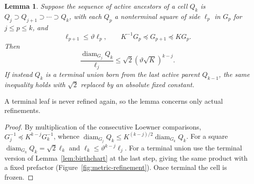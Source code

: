 \documentclass[11pt]{article}
\newtheorem{lemma}[lemma]{Lemma}
\theoremstyle{definition}
\theoremstyle{remark}
\numberwithin{equation}{section}
\begin{document}
\begin{lemma}
\label{lem:ancestorindexed}
Suppose the sequence of active ancestors of a cell $Q_k$ is
$Q_j\supset Q_{j+1}\supset\cdots\supset Q_k$, with each
$Q_p$ a nonterminal square of side $\ell_p$ in $G_p$ for
$j\le p\le k$, and
\[
 \ell_{p+1}\le\vartheta\ell_p,\qquad
 K^{-1}G_p\preceq G_{p+1}\preceq KG_p.
\]
Then
\begin{equation}\label{eq:appancestor}
 \frac{\operatorname{diam}_{G_j}Q_k}{\ell_j}
 \le\sqrt2(\vartheta\sqrt K)^{k-j}.
\end{equation}
If instead $Q_k$ is a terminal union born from the last active
parent $Q_{k-1}$, the same inequality holds with $\sqrt2$
replaced by an absolute fixed constant.
\end{lemma}

A terminal leaf is never refined again, so the lemma concerns only
actual refinements.
\begin{proof}
By multiplication of the consecutive Loewner comparisons,
$G_j^{-1}\preceq K^{k-j}G_k^{-1}$, whence
$\operatorname{diam}_{G_j}Q_k\le
 K^{(k-j)/2}\operatorname{diam}_{G_k}Q_k$.
For a square $\operatorname{diam}_{G_k}Q_k=\sqrt2\ell_k$
and $\ell_k\le\vartheta^{k-j}\ell_j$.
For a terminal union use the terminal version of
Lemma~\ref{lem:birthchart} at the last step, giving the same
product with a fixed prefactor (Figure~\ref{fig:metric-refinement}). Once terminal the cell is frozen.
\end{proof}
\end{document}
